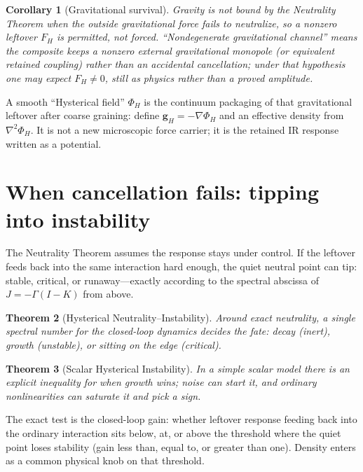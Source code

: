 \documentclass[11pt]{article}
\newtheorem{theorem}{Theorem}[section]
\newtheorem{corollary}[theorem]{Corollary}
\theoremstyle{remark}
\newcommand{\Gm}{\Gamma}
\begin{document}
\begin{corollary}[Gravitational survival]
Gravity is not bound by the Neutrality Theorem when the outside gravitational force fails to neutralize, so a nonzero leftover $F_H$ is \emph{permitted}, not forced.
``Nondegenerate gravitational channel'' means the composite keeps a nonzero external gravitational monopole (or equivalent retained coupling) rather than an accidental cancellation; under that hypothesis one may \emph{expect} $F_H\neq0$, still as physics rather than a proved amplitude.
\end{corollary}

A smooth ``Hysterical field'' $\Phi_H$ is the continuum packaging of that gravitational leftover after coarse graining: define $\mathbf g_H=-\nabla\Phi_H$ and an effective density from $\nabla^2\Phi_H$.
It is not a new microscopic force carrier; it is the retained IR response written as a potential.

\section{When cancellation fails: tipping into instability}
The Neutrality Theorem assumes the response stays under control.
If the leftover feeds back into the same interaction hard enough, the quiet neutral point can tip: stable, critical, or runaway---exactly according to the spectral abscissa of $J=-\Gm(I-K)$ from above.

\begin{theorem}[Hysterical Neutrality--Instability]
Around exact neutrality, a single spectral number for the closed-loop dynamics decides the fate: decay (inert), growth (unstable), or sitting on the edge (critical).
\end{theorem}

\begin{theorem}[Scalar Hysterical Instability]
In a simple scalar model there is an explicit inequality for when growth wins; noise can start it, and ordinary nonlinearities can saturate it and pick a sign.
\end{theorem}

The exact test is the closed-loop gain: whether leftover response feeding back into the ordinary interaction sits below, at, or above the threshold where the quiet point loses stability (gain less than, equal to, or greater than one).
Density enters as a common physical knob on that threshold.
\end{document}
